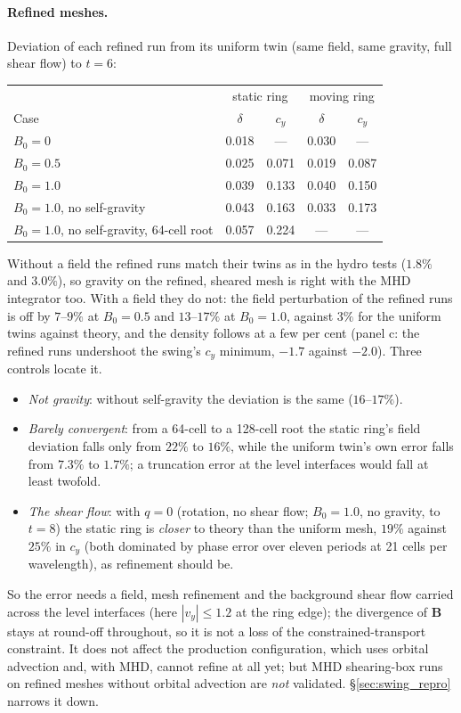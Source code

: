 \documentclass[11pt]{article}
\begin{document}
\paragraph{Refined meshes.} Deviation of each refined run from its uniform twin (same field,
same gravity, full shear flow) to $t = 6$:
\begin{center}
\small
\begin{tabular}{@{}lcccc@{}}
\toprule
& \multicolumn{2}{c}{static ring} & \multicolumn{2}{c}{moving ring} \\
Case & $\delta$ & $c_y$ & $\delta$ & $c_y$ \\
\midrule
$B_0 = 0$                                  & 0.018 & ---   & 0.030 & ---   \\
$B_0 = 0.5$                                & 0.025 & 0.071 & 0.019 & 0.087 \\
$B_0 = 1.0$                                & 0.039 & 0.133 & 0.040 & 0.150 \\
$B_0 = 1.0$, no self-gravity               & 0.043 & 0.163 & 0.033 & 0.173 \\
$B_0 = 1.0$, no self-gravity, 64-cell root & 0.057 & 0.224 & ---   & ---   \\
\bottomrule
\end{tabular}
\end{center}
Without a field the refined runs match their twins as in the hydro tests ($1.8\%$ and
$3.0\%$), so gravity on the refined, sheared mesh is right with the MHD integrator too. With
a field they do not: the field perturbation of the refined runs is off by $7$--$9\%$ at
$B_0 = 0.5$ and $13$--$17\%$ at $B_0 = 1.0$, against $3\%$ for the uniform twins against
theory, and the density follows at a few per cent (panel c: the refined runs undershoot the
swing's $c_y$ minimum, $-1.7$ against $-2.0$). Three controls locate it.
\begin{itemize}\itemsep2pt
\item \emph{Not gravity}: without self-gravity the deviation is the same ($16$--$17\%$).
\item \emph{Barely convergent}: from a 64-cell to a 128-cell root the static ring's field
      deviation falls only from $22\%$ to $16\%$, while the uniform twin's own error falls
      from $7.3\%$ to $1.7\%$; a truncation error at the level interfaces would fall at
      least twofold.
\item \emph{The shear flow}: with $q = 0$ (rotation, no shear flow; $B_0 = 1.0$, no gravity,
      to $t = 8$) the static ring is \emph{closer} to theory than the uniform mesh, $19\%$
      against $25\%$ in $c_y$ (both dominated by phase error over eleven periods at 21 cells
      per wavelength), as refinement should be.
\end{itemize}
So the error needs a field, mesh refinement and the background shear flow carried across the
level interfaces (here $|v_y| \le 1.2$ at the ring edge); the divergence of $\mathbf B$ stays
at round-off throughout, so it is not a loss of the constrained-transport constraint. It does
not affect the production configuration, which uses orbital advection and, with MHD, cannot
refine at all yet; but MHD shearing-box runs on refined meshes without orbital advection are
\emph{not} validated. \S\ref{sec:swing_repro} narrows it down.
\end{document}
